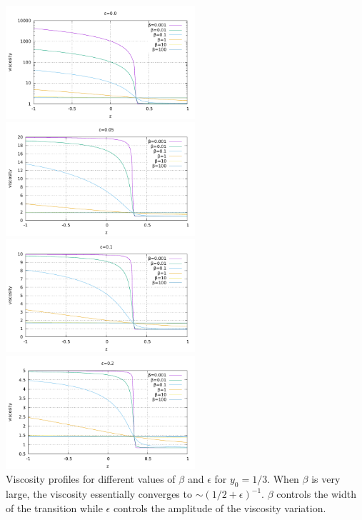 \begin{center}
\includegraphics[width=7cm]{images/benchmark_layeredflow/viscosityA}
\includegraphics[width=7cm]{images/benchmark_layeredflow/viscosityB}\\
\includegraphics[width=7cm]{images/benchmark_layeredflow/viscosityC}
\includegraphics[width=7cm]{images/benchmark_layeredflow/viscosityD}\\
{\captionfont Viscosity profiles for different values of $\beta$ and $\epsilon$ 
for $y_0=1/3$.
When $\beta$ is very large, the viscosity 
essentially converges to $\sim (1/2 + \epsilon)^{-1}$. 
$\beta$ controls the width of the transition while $\epsilon$ controls the amplitude 
of the viscosity variation.}
\end{center}

